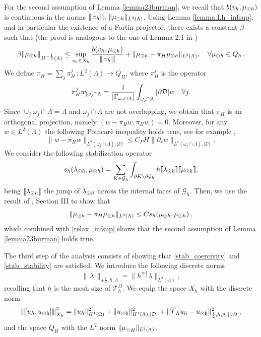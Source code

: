 \documentclass[r]{siamart171218}
\newcommand{\miro}[1]{{\color{cyan}#1}}
\begin{document}
For the second assumption of Lemma \ref{lemma23burman}, we recall that $b(v_h,\mu_{\odot h})$ is continuous in the norms ${\left\vert\kern-0.25ex\left\vert\kern-0.25ex\left\vert v_h \right\vert\kern-0.25ex\right\vert\kern-0.25ex\right\vert},\,\|\mu_{\odot h}\|_{L^2(\Lambda)}$. 
Using Lemma \ref{lemma:Lh_infsup}, and in particular the existence of a Fortin projector,
there exists a constant $\beta$ such that 
(the proof is \miro{analogous} to the one of Lemma 2.1 in \cite{burman2014})
\begin{equation}\label{relax_infsup}
\beta \|\mdh\|_{H^{-\frac12}(\Lambda)} \leq \sup\limits_{v_h \in X_h} \frac{b(v_h,\mdh)}{\vertiii{v_h}} + \|\mdh-\pi_H \mdh\|_{L^2(\Lambda)}, \quad \forall \mdh \in Q_h\,.
\end{equation}
We define $\pi_H = \sum_j \pi_H^j\,: L^2(\Lambda) \rightarrow Q_H$, 
where $\pi_H^j$ is the operator
\begin{equation}\label{eq:projector}
\pi_H^j w_{|\patch \cap \Lambda} =\frac{1}{|\Gamma_{\patch\cap \Lambda}|}\int_{\patch\cap \Lambda}|\DD| w\quad \forall j.
\end{equation}   
Since $\cup_j \omega_j \cap \Lambda  = \Lambda$ and $\omega_j \cap \Lambda$ are not overlapping,
we obtain that $\pi_H$ is an orthogonal projection, namely $(w-\pi_H w,\pi_H w)=0$.
Moreover, for any $w \in L^2(\Lambda)$ the following Poincarè inequality holds true, see for example \cite[Corollary B.65]{MR2050138},
\begin{equation}\label{disc_poincare_ineq}
\|w - \pi_H w\|_{L^2(\omega_j\cap\Lambda),|\DD|} \leq C_P H \|\partial_s w\|_{L^2(\omega_j\cap\Lambda),|\DD|}\,.
\end{equation}
We consider the following stabilization operator
\begin{equation}\label{eq:stab}
s_h(\ldh, \mdh)= \sum _{K\in \mathcal{G}_{h}} \int_{\partial K\setminus \partial \mathcal{G}_{h}} h \llbracket \ldh \rrbracket \llbracket \mdh \rrbracket,
\end{equation}
being $\llbracket \lambda_{\odot h} \rrbracket$ the jump of $\lambda_{\odot h}$ across the internal faces of $\mathcal{G}_h$.
Then, we use the result of \cite{burman2014}, Section III to show that
\begin{equation*}
    \|\mu_{\odot h}-\pi_H \mu_{\odot h}\|_{L^2(\Lambda)} \leq C s_h(\mu_{\odot h}, \mu_{\odot h})\,,
\end{equation*}
which combined with \eqref{relax_infsup} shows that the second assumption of Lemma \ref{lemma23burman} holds true.

The third step of the analysis consists of showing that \eqref{stab_coercivity} and \eqref{stab_stability} are satisfied. 
We introduce the following discrete norms
\begin{equation*}
\|\, \lambda \,\|_{\pm \frac 12, h, \Lambda} = \|h^{\mp\frac 12} \lambda\|_{L^2(\Lambda)},
\end{equation*}
recalling that $h$ is the mesh size of $\mathcal{T}^\Omega_{h}$. We equip the space $X_h$ with the discrete norm
\begin{equation*}
{\left\vert\kern-0.25ex\left\vert\kern-0.25ex\left\vert [u_h, u_{\odot \mathfrak{h}}] \right\vert\kern-0.25ex\right\vert\kern-0.25ex\right\vert}^2_{X_h}
= \|u_h\|^2_{H^1(\Omega)}+\|u_{\odot \mathfrak{h}}\|^2_{H^1(\Lambda),|\mathcal{D}|} + \|{\overline{\mathcal{T}}_\Lambda} u_h - u_{\odot \mathfrak{h}}\|^2_{\frac 12, h, \Lambda, |\partial\mathcal{D}|},
\end{equation*}
and the space $Q_H$ with the $L^2$ norm $\|{\mu_{\odot}}_H \|_{L^2(\Lambda)}$.
\end{document}
